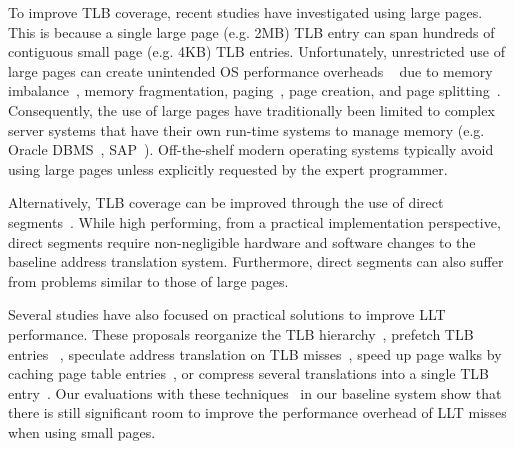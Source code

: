 To improve TLB coverage, recent studies have investigated using large
pages. This is because a single large page (e.g. 2MB) TLB entry can
span hundreds of contiguous small page (e.g. 4KB) TLB entries.
Unfortunately, unrestricted use of large pages can create unintended
OS performance overheads ~\cite{SuperPageProblem, TwoPageSize} due to
memory imbalance~\cite{numa-harmful}, memory fragmentation,
paging~\cite{cameo}, page creation, and page
splitting~\cite{largepagevm}. Consequently, the use of large pages
have traditionally been limited to complex server systems that have
their own run-time systems to manage memory (e.g. Oracle
DBMS~\cite{oracle_dbms}, SAP~\cite{sap}). Off-the-shelf modern
operating systems typically avoid using large pages unless explicitly
requested by the expert programmer.

Alternatively, TLB coverage can be improved through the use of direct
segments~\cite{Basu2013}. While high performing, from a practical
implementation perspective, direct segments require non-negligible
hardware and software changes to the baseline address translation
system. Furthermore, direct segments can also suffer from problems
similar to those of large pages.


Several studies have also focused on practical solutions to improve
LLT performance. These proposals reorganize the TLB
hierarchy~\cite{SharedLLT}, prefetch TLB entries
~\cite{prefTLBintercore, prefTLBgokul, prefTLBrecency,
power2014supporting}, speculate address translation on TLB
misses~\cite{spectlb}, speed up page walks by caching page table
entries~\cite{SkipPT, MMUcaches, power2014supporting}, or compress
several translations into a single TLB entry~\cite{COLT}. Our
evaluations with these techniques~\cite{SharedLLT, COLT, MMUcaches} in
our baseline system show that there is still significant room to
improve the performance overhead of LLT misses when using small pages.



